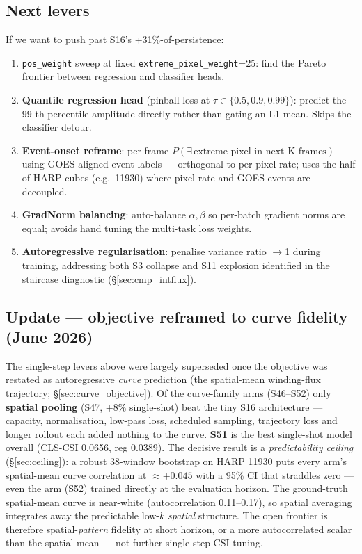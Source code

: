 \subsection*{Next levers}
If we want to push past S16's +31\%-of-persistence:
\begin{enumerate}[leftmargin=18pt,itemsep=2pt,topsep=2pt]
\item \texttt{pos\_weight} sweep at fixed
      \texttt{extreme\_pixel\_weight}{=}25: find the Pareto
      frontier between regression and classifier heads.
\item \textbf{Quantile regression head} (pinball loss at
      \(\tau\in\{0.5,0.9,0.99\}\)): predict the 99-th percentile
      amplitude directly rather than gating an L1 mean. Skips the
      classifier detour.
\item \textbf{Event-onset reframe}: per-frame
      \(P(\exists\,\text{extreme pixel in next K frames})\) using
      GOES-aligned event labels --- orthogonal to per-pixel rate; uses
      the half of HARP cubes (e.g.\ 11930) where pixel rate and GOES
      events are decoupled.
\item \textbf{GradNorm balancing}: auto-balance
      \(\alpha, \beta\) so per-batch gradient norms are equal; avoids
      hand tuning the multi-task loss weights.
\item \textbf{Autoregressive regularisation}: penalise variance ratio
      \(\to\)1 during training, addressing both S3 collapse and S11
      explosion identified in the staircase diagnostic (\S\ref{sec:cmp_intflux}).
\end{enumerate}

\subsection*{Update --- objective reframed to curve fidelity (June 2026)}
The single-step levers above were largely superseded once the objective was
restated as autoregressive \emph{curve} prediction (the spatial-mean
winding-flux trajectory; \S\ref{sec:curve_objective}). Of the curve-family arms
(S46--S52) only \textbf{spatial pooling} (S47, $+8\%$ single-shot) beat the tiny
S16 architecture --- capacity, normalisation, low-pass loss, scheduled
sampling, trajectory loss and longer rollout each added nothing to the curve.
\textbf{S51} is the best single-shot model overall (CLS-CSI 0.0656, reg 0.0389).
The decisive result is a \emph{predictability ceiling}
(\S\ref{sec:ceiling}): a robust 38-window bootstrap on HARP 11930 puts every
arm's spatial-mean curve correlation at $\approx +0.045$ with a 95\% CI that
straddles zero --- even the arm (S52) trained directly at the evaluation
horizon. The ground-truth spatial-mean curve is near-white (autocorrelation
0.11--0.17), so spatial averaging integrates away the predictable low-$k$
\emph{spatial} structure. The open frontier is therefore spatial-\emph{pattern}
fidelity at short horizon, or a more autocorrelated scalar than the spatial
mean --- not further single-step CSI tuning.

